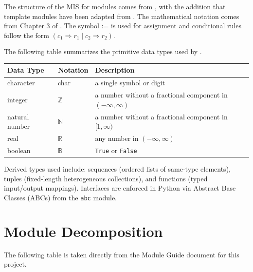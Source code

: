 \documentclass[12pt, titlepage]{article}
\begin{document}
The structure of the MIS for modules comes from \citet{HoffmanAndStrooper1995},
with the addition that template modules have been adapted from
\cite{GhezziEtAl2003}. The mathematical notation comes from Chapter 3 of
\citet{HoffmanAndStrooper1995}. The symbol := is used for assignment and
conditional rules follow the form $(c_1 \Rightarrow r_1 \mid c_2 \Rightarrow r_2)$.

The following table summarizes the primitive data types used by \progname.

\begin{center}
\renewcommand{\arraystretch}{1.2}
\noindent
\begin{tabular}{l l p{7.5cm}}
\toprule
\textbf{Data Type} & \textbf{Notation} & \textbf{Description}\\
\midrule
character & char & a single symbol or digit\\
integer & $\mathbb{Z}$ & a number without a fractional component in $(-\infty, \infty)$ \\
natural number & $\mathbb{N}$ & a number without a fractional component in $[1, \infty)$ \\
real & $\mathbb{R}$ & any number in $(-\infty, \infty)$\\
boolean & $\mathbb{B}$ & \texttt{True} or \texttt{False}\\
\bottomrule
\end{tabular}
\end{center}

\noindent
Derived types used include: sequences (ordered lists of same-type elements),
tuples (fixed-length heterogeneous collections), and functions (typed
input/output mappings). Interfaces are enforced in Python via Abstract Base
Classes (ABCs) from the \texttt{abc} module.

\section{Module Decomposition}

The following table is taken directly from the Module Guide document for this project.
\end{document}
